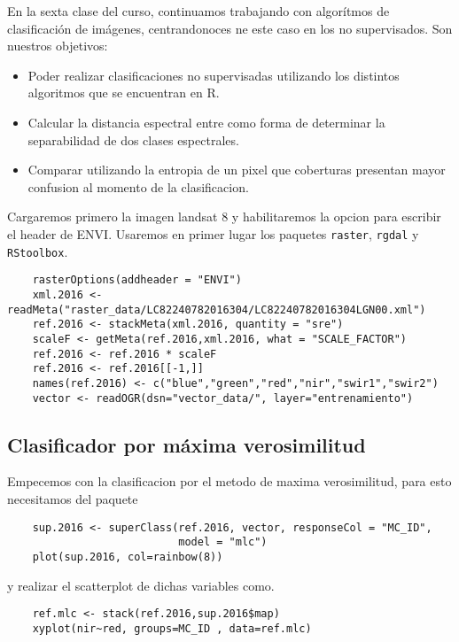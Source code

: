 En la sexta clase del curso, continuamos trabajando con algor\'itmos de clasificaci\'on
de im\'agenes, centrandonoces ne este caso en los no supervisados. Son nuestros objetivos:

\begin{itemize}
  \item Poder realizar clasificaciones no supervisadas utilizando los distintos
  algoritmos que se encuentran en R.
  \item Calcular la distancia espectral entre como forma de determinar la separabilidad
  de dos clases espectrales.
  \item Comparar utilizando la entropia de un pixel que coberturas presentan
  mayor confusion al momento de la clasificacion.
\end{itemize}

Cargaremos primero la imagen landsat 8 y habilitaremos la opcion para escribir
el header de ENVI\@. Usaremos en primer lugar los paquetes \texttt{raster},
\texttt{rgdal} y \texttt{RStoolbox}.

\begin{lstlisting}
    rasterOptions(addheader = "ENVI")
    xml.2016 <- readMeta("raster_data/LC82240782016304/LC82240782016304LGN00.xml")
    ref.2016 <- stackMeta(xml.2016, quantity = "sre")
    scaleF <- getMeta(ref.2016,xml.2016, what = "SCALE_FACTOR")
    ref.2016 <- ref.2016 * scaleF
    ref.2016 <- ref.2016[[-1,]]
    names(ref.2016) <- c("blue","green","red","nir","swir1","swir2")
    vector <- readOGR(dsn="vector_data/", layer="entrenamiento")
\end{lstlisting}

\subsection{Clasificador por m\'axima verosimilitud}

Empecemos con la clasificacion por el metodo de maxima verosimilitud, para esto
necesitamos del paquete

\begin{lstlisting}
    sup.2016 <- superClass(ref.2016, vector, responseCol = "MC_ID",
                           model = "mlc")
    plot(sup.2016, col=rainbow(8))
\end{lstlisting}

y realizar el scatterplot de dichas variables como.

\begin{lstlisting}
    ref.mlc <- stack(ref.2016,sup.2016$map)
    xyplot(nir~red, groups=MC_ID , data=ref.mlc)
\end{lstlisting}

